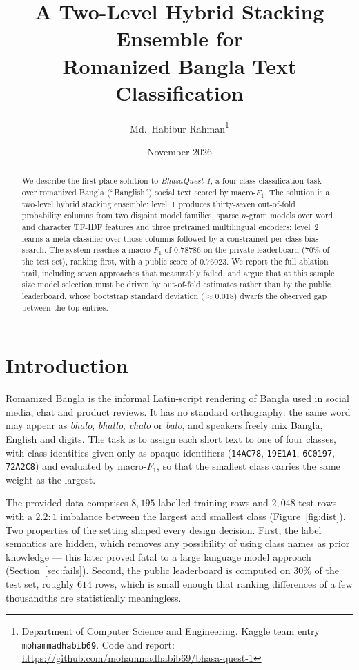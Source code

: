 \documentclass[11pt,a4paper]{article}
\title{\vspace{-1.2cm}\textbf{A Two-Level Hybrid Stacking Ensemble for\\Romanized Bangla Text Classification}}
\author{Md.\ Habibur Rahman\thanks{Department of Computer Science and Engineering.
  Kaggle team entry \texttt{mohammadhabib69}. Code and report:
  \url{https://github.com/mohammadhabib69/bhasa-quest-1}}}
\date{November 2026}
\begin{document}
\maketitle

\begin{abstract}
\noindent
We describe the first-place solution to \emph{BhasaQuest-1}, a four-class classification task over
romanized Bangla (``Banglish'') social text scored by macro-$F_1$. The solution is a two-level
hybrid stacking ensemble: level~1 produces thirty-seven out-of-fold probability columns from two disjoint
model families, sparse $n$-gram models over word and character TF-IDF features and three pretrained
multilingual encoders; level~2 learns a meta-classifier over those columns followed by a constrained
per-class bias search. The system reaches a macro-$F_1$ of $0.78786$ on the private leaderboard
($70\%$ of the test set), ranking first, with a public score of $0.76023$. We report the full
ablation trail, including seven approaches that measurably failed, and argue that at this sample size
model selection must be driven by out-of-fold estimates rather than by the public leaderboard, whose
bootstrap standard deviation ($\approx 0.018$) dwarfs the observed gap between the top entries.
\end{abstract}

\section{Introduction}

Romanized Bangla is the informal Latin-script rendering of Bangla used in social media, chat and
product reviews. It has no standard orthography: the same word may appear as \textit{bhalo},
\textit{bhallo}, \textit{vhalo} or \textit{balo}, and speakers freely mix Bangla, English and digits.
The task is to assign each short text to one of four classes, with class identities given only as
opaque identifiers (\texttt{14AC78}, \texttt{19E1A1}, \texttt{6C0197}, \texttt{72A2C8}) and
evaluated by macro-$F_1$, so that the smallest class carries the same weight as the largest.

The provided data comprises $8{,}195$ labelled training rows and $2{,}048$ test rows with a
$2.2{:}1$ imbalance between the largest and smallest class (Figure~\ref{fig:dist}). Two properties
of the setting shaped every design decision. First, the label semantics are hidden, which removes
any possibility of using class names as prior knowledge --- this later proved fatal to a large
language model approach (Section~\ref{sec:fails}). Second, the public leaderboard is computed on
$30\%$ of the test set, roughly $614$ rows, which is small enough that ranking differences of a few
thousandths are statistically meaningless.
\end{document}
